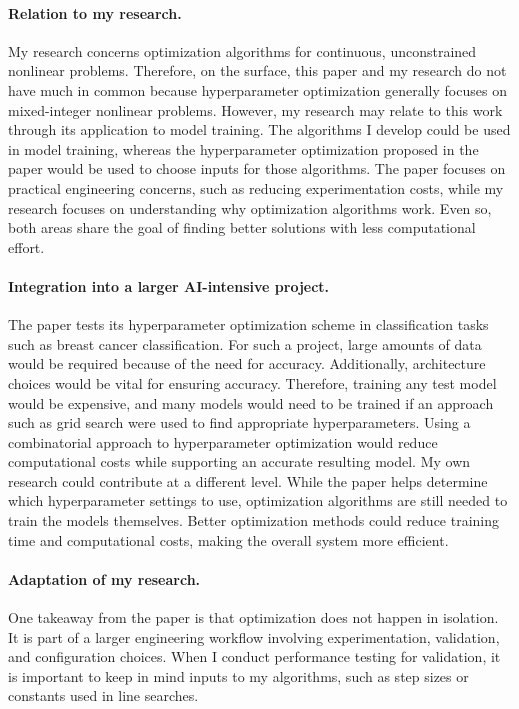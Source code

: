 \documentclass[12pt]{article}
\begin{document}
\paragraph{Relation to my research.} My research concerns optimization algorithms for continuous, unconstrained nonlinear problems. Therefore, on the surface, this paper and my research do not have much in common because hyperparameter optimization generally focuses on mixed-integer nonlinear problems. However, my research may relate to this work through its application to model training. The algorithms I develop could be used in model training, whereas the hyperparameter optimization proposed in the paper would be used to choose inputs for those algorithms.
The paper focuses on practical engineering concerns, such as reducing experimentation costs, while my research focuses on understanding why optimization algorithms work. Even so, both areas share the goal of finding better solutions with less computational effort.
\paragraph{Integration into a larger AI-intensive project.} The paper tests its hyperparameter optimization scheme in classification tasks such as breast cancer classification. For such a project, large amounts of data would be required because of the need for accuracy. Additionally, architecture choices would be vital for ensuring accuracy. Therefore, training any test model would be expensive, and many models would need to be trained if an approach such as grid search were used to find appropriate hyperparameters. Using a combinatorial approach to hyperparameter optimization would reduce computational costs while supporting an accurate resulting model.
My own research could contribute at a different level. While the paper helps determine which hyperparameter settings to use, optimization algorithms are still needed to train the models themselves. Better optimization methods could reduce training time and computational costs, making the overall system more efficient.
\paragraph{Adaptation of my research.} One takeaway from the paper is that optimization does not happen in isolation. It is part of a larger engineering workflow involving experimentation, validation, and configuration choices. When I conduct performance testing for validation, it is important to keep in mind inputs to my algorithms, such as step sizes or constants used in line searches.
\end{document}
